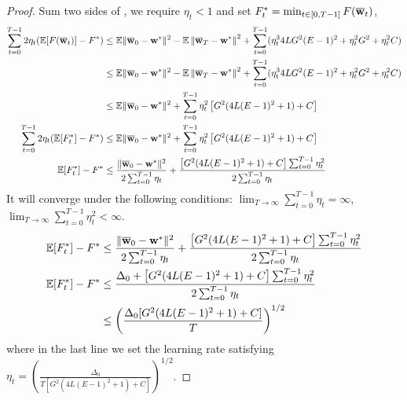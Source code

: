 \begin{proof}
Sum two sides of \eq{\ref{eq:cvxsgd1}}, we require $\eta_t < 1$ and set $F^*_t = \min_{t \in [0, T-1]} F({\overline{\mathbf{w}}}_t)$, 
\begin{align*}
	\sum_{t=0}^{T-1} 2\eta_t (\mathbb{E}[F({\overline{\mathbf{w}}}_t)] - F^* ) & \leq \mathbb{E} \|{\overline{\mathbf{w}}}_{0}-{\mathbf{w}}^{*}\|^{2} - \mathbb{E}\left\|{\overline{\mathbf{w}}}_{T}-{\mathbf{w}}^{*}\right\|^2 + \sum_{t=0}^{T-1} (\eta_t^3 4LG^2(E-1)^2 + \eta_t^2 G^2+ \eta_t^2 C)\\ 
    & \leq \mathbb{E} \|{\overline{\mathbf{w}}}_{0}-{\mathbf{w}}^{*}\|^{2} - \mathbb{E}\left\|{\overline{\mathbf{w}}}_{T}-{\mathbf{w}}^{*}\right\|^2 + \sum_{t=0}^{T-1} (\eta_t^3 4LG^2(E-1)^2 + \eta_t^2 G^2+ \eta_t^2 C)\\ 
    & \leq \mathbb{E} \|{\overline{\mathbf{w}}}_{0}-{\mathbf{w}}^{*}\|^{2} + \sum_{t=0}^{T-1}\eta_t^2\left[ G^2 ( 4L(E-1)^2 + 1) + C\right]\\
    \sum_{t=0}^{T-1} 2\eta_t (\mathbb{E}[F^*_t] - F^* ) & \leq \mathbb{E} \|{\overline{\mathbf{w}}}_{0}-{\mathbf{w}}^{*}\|^{2} + \sum_{t=0}^{T-1}\eta_t^2\left[ G^2 ( 4L(E-1)^2 + 1) + C\right]\\
\mathbb{E}[ F_t^*] - F^*  & \leq \frac{\|{\overline{\mathbf{w}}}_{0}-{\mathbf{w}}^{*}\|^{2}}{2 \sum_{t=0}^{T-1} \eta_t } + \frac{\left[G^2( 4L(E-1)^2 + 1) + C\right] \sum_{t=0}^{T-1} \eta_t^2}{2 \sum_{t=0}^{T-1} \eta_t }
\end{align*}
It will converge under the following conditions: $ \lim_{T \rightarrow \infty }\sum_{t=0}^{T-1} \eta_t = \infty$, 
$ \lim_{T \rightarrow \infty }\sum_{t=0}^{T-1} \eta_t^2 < \infty$. 
\begin{align*}
	\mathbb{E}[ F_t^*] - F^*  & \leq \frac{\|{\overline{\mathbf{w}}}_{0}-{\mathbf{w}}^{*}\|^{2}}{2 \sum_{t=0}^{T-1} \eta_t } + \frac{\left[G^2( 4L(E-1)^2 + 1) + C\right] \sum_{t=0}^{T-1} \eta_t^2}{2 \sum_{t=0}^{T-1} \eta_t } \\
	\mathbb{E}[ F_t^*] - F^*  & \leq \frac{\Delta_0 + \left[G^2( 4L(E-1)^2 + 1) + C\right] \sum_{t=0}^{T-1} \eta_t^2 }{2 \sum_{t=0}^{T-1} \eta_t }\\
	& \leq \left(\frac{ \Delta_0 [G^2( 4L(E-1)^2 + 1) + C] }{T}\right)^{1/2}
\end{align*}
where in the last line we set the learning rate satisfying $\eta_t =  \left(\frac{\Delta_0}{ T [G^2( 4L(E-1)^2 + 1) + C]}\right)^{1/2}$.
\end{proof}